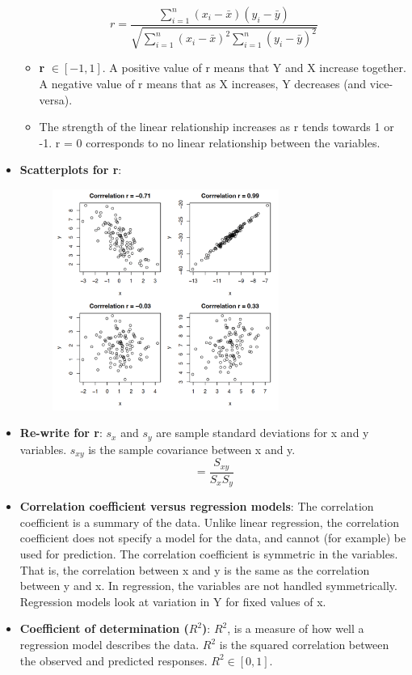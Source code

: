 \documentclass[12pt]{article}
\begin{document}
\begin{itemize}
$$r = \frac{\sum_{i=1}^{n} (x_i - \bar{x})(y_i - \bar{y})}{\sqrt{\sum_{i=1}^{n}(x_i - \bar{x})^2 \sum_{i=1}^{n}(y_i - \bar{y})^2}}$$
\begin{itemize}
\item \textbf{r} $\in [-1, 1]$. A positive value of r means that Y and X increase together. A negative value of r means that as X increases, Y decreases (and vice-versa). 
\item The strength of the linear relationship increases as r tends towards 1 or -1. r = 0 corresponds to no linear relationship between the variables.
\end{itemize}
\item \textbf{Scatterplots for r}: 
\begin{figure}[H]
    \centering
    \includegraphics[width=0.7\textwidth]{8.png}
\end{figure}
\item \textbf{Re-write for r}: $s_x$ and $s_y$ are sample standard deviations for x and y variables. $s_{xy}$ is the sample covariance between x and y.
$$= \frac{S_{xy}}{S_x S_y}$$
\item \textbf{Correlation coefficient versus regression models}: The correlation coefficient is a summary of the data. Unlike linear regression, the correlation coefficient does not specify a model for the data, and cannot (for example) be used for prediction. The correlation coefficient is symmetric in the variables. That is, the correlation between x and y is the same as the correlation between y and x. In regression, the variables are not handled symmetrically. Regression models look at variation in Y for fixed values of x.
\item \textbf{Coefficient of determination ($R^2$)}: $R^2$, is a measure of how well a regression model describes the data. $R^2$ is the squared correlation between the observed and predicted responses. $R^2 \in [0, 1]$.

\end{itemize}
\end{document}
